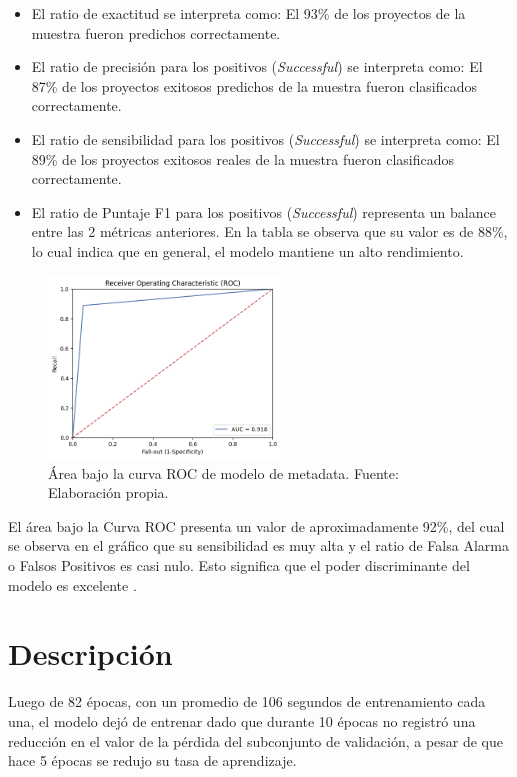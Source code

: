 \begin{itemize}
	\item El ratio de exactitud se interpreta como: El 93\% de los proyectos de la muestra fueron predichos correctamente.
	\item El ratio de precisión para los positivos (\textit{Successful}) se interpreta como: El 87\% de los proyectos exitosos predichos de la muestra fueron clasificados correctamente. 
	\item El ratio de sensibilidad para los positivos (\textit{Successful}) se interpreta como: El 89\% de los proyectos exitosos reales de la muestra fueron clasificados correctamente.
	\item El ratio de Puntaje F1 para los positivos (\textit{Successful}) representa un balance entre las 2 métricas anteriores. En la tabla se observa que su valor es de 88\%, lo cual indica que en general, el modelo mantiene un alto rendimiento.
\end{itemize}

\begin{figure}[!ht]
	\begin{center}
		\includegraphics[width=0.55\textwidth]{5/figures/metadata_auc.png}
		\caption{Área bajo la curva ROC de modelo de metadata. Fuente: Elaboración propia.}
		\label{5:fig3}
	\end{center}
\end{figure}

El área bajo la Curva ROC presenta un valor de aproximadamente 92\%, del cual se observa en el gráfico que su sensibilidad es muy alta y el ratio de Falsa Alarma o Falsos Positivos es casi nulo. Esto significa que el poder discriminante del modelo es excelente \parencite{bk_britos2006datamining}.

\section{Descripción}
Luego de 82 épocas, con un promedio de 106 segundos de entrenamiento cada una, el modelo dejó de entrenar dado que durante 10 épocas no registró una reducción en el valor de la pérdida del subconjunto de validación, a pesar de que hace 5 épocas se redujo su tasa de aprendizaje.

